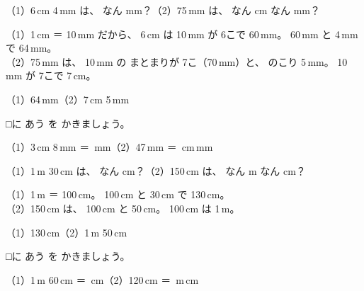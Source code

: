 \begin{reidai}[cm と mm を かえる]
（1）6\,cm 4\,mm は、 なん mm？\hspace{2\zw}（2）75\,mm は、 なん cm なん mm？

\kangaekata （1）1\,cm ＝ 10\,mm だから、 6\,cm は 10\,mm が 6こで 60\,mm。 60\,mm と 4\,mm で 64\,mm。\\
（2）75\,mm は、 10\,mm の まとまりが 7こ（70\,mm）と、 のこり 5\,mm。 10\,mm が 7こで 7\,cm。

\kotae （1）64\,mm\hspace{3\zw}（2）7\,cm 5\,mm
\end{reidai}

\begin{jibun}
□に あう を かきましょう。\par\vspace{3pt}
\noindent\hspace*{1\zw}（1）3\,cm 8\,mm ＝ \bkkakikomi[14mm]\,mm\hspace{3\zw}（2）47\,mm ＝ \bkkakikomi\,cm\enspace\bkkakikomi\,mm
\end{jibun}

\begin{reidai}[m と cm を かえる]
（1）1\,m 30\,cm は、 なん cm？\hspace{2\zw}（2）150\,cm は、 なん m なん cm？

\kangaekata （1）1\,m ＝ 100\,cm。 100\,cm と 30\,cm で 130\,cm。\\
（2）150\,cm は、 100\,cm と 50\,cm。 100\,cm は 1\,m。

\kotae （1）130\,cm\hspace{3\zw}（2）1\,m 50\,cm
\end{reidai}

\begin{jibun}
□に あう を かきましょう。\par\vspace{3pt}
\noindent\hspace*{1\zw}（1）1\,m 60\,cm ＝ \bkkakikomi[14mm]\,cm\hspace{3\zw}（2）120\,cm ＝ \bkkakikomi\,m\enspace\bkkakikomi\,cm
\end{jibun}

